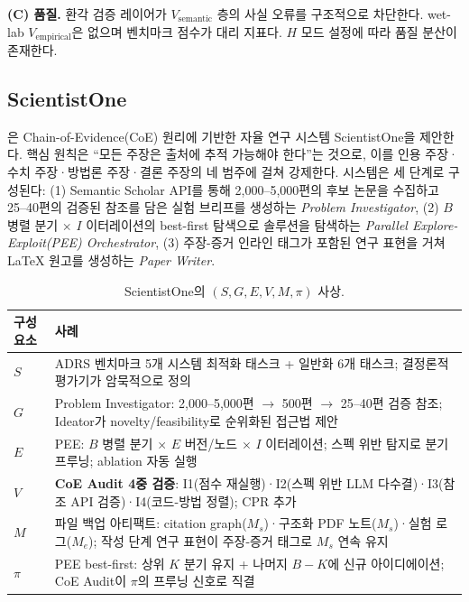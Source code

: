 \documentclass[11pt]{article}
\newcommand{\sgmvpi}{$(S, G, E, V, M, \pi)$}
\begin{document}
\noindent\textbf{(C) 품질.} 환각 검증 레이어가 $V_\text{semantic}$ 층의 사실 오류를 구조적으로 차단한다. wet-lab $V_\text{empirical}$은 없으며 벤치마크 점수가 대리 지표다. $H$ 모드 설정에 따라 품질 분산이 존재한다.

\subsection{ScientistOne}
\label{sec:scientistone}

\citet{meng2026scientistone}은 Chain-of-Evidence(CoE) 원리에 기반한 자율 연구 시스템 ScientistOne을 제안한다. 핵심 원칙은 ``모든 주장은 출처에 추적 가능해야 한다''는 것으로, 이를 인용 주장·수치 주장·방법론 주장·결론 주장의 네 범주에 걸쳐 강제한다. 시스템은 세 단계로 구성된다: (1) Semantic Scholar API를 통해 2,000--5,000편의 후보 논문을 수집하고 25--40편의 검증된 참조를 담은 실험 브리프를 생성하는 \textit{Problem Investigator}, (2) $B$ 병렬 분기 $\times$ $I$ 이터레이션의 best-first 탐색으로 솔루션을 탐색하는 \textit{Parallel Explore-Exploit(PEE) Orchestrator}, (3) 주장-증거 인라인 태그가 포함된 연구 표현을 거쳐 \LaTeX{} 원고를 생성하는 \textit{Paper Writer}.

\begin{table}[h]
\centering
\small
\begin{tabular}{@{}lp{9cm}@{}}
\toprule
구성요소 & 사례 \\
\midrule
$S$ & ADRS 벤치마크 5개 시스템 최적화 태스크 + 일반화 6개 태스크; 결정론적 평가기가 암묵적으로 정의 \\
$G$ & Problem Investigator: 2,000--5,000편 $\to$ 500편 $\to$ 25--40편 검증 참조; Ideator가 novelty/feasibility로 순위화된 접근법 제안 \\
$E$ & PEE: $B$ 병렬 분기 $\times$ $E$ 버전/노드 $\times$ $I$ 이터레이션; 스펙 위반 탐지로 분기 프루닝; ablation 자동 실행 \\
$V$ & \textbf{CoE Audit 4중 검증}: I1(점수 재실행)·I2(스펙 위반 LLM 다수결)·I3(참조 API 검증)·I4(코드-방법 정렬); CPR 추가 \\
$M$ & 파일 백업 아티팩트: citation graph($M_s$)·구조화 PDF 노트($M_s$)·실험 로그($M_e$); 작성 단계 연구 표현이 주장-증거 태그로 $M_s$ 연속 유지 \\
$\pi$ & PEE best-first: 상위 $K$ 분기 유지 + 나머지 $B-K$에 신규 아이디에이션; CoE Audit이 $\pi$의 프루닝 신호로 직결 \\
\bottomrule
\end{tabular}
\caption{ScientistOne의 \sgmvpi{} 사상.}
\end{table}
\end{document}
